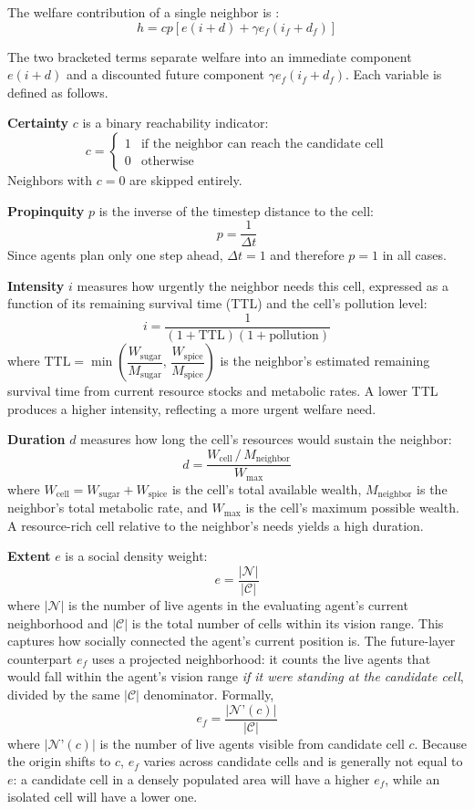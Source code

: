 \documentclass{icsthesis}
\begin{document}
\begin{mainmatter}
The welfare contribution of a single neighbor is \citep{KremerHerman2024b}:
\[ h = cp \left[ e(i+d) + \gamma e_f(i_f+d_f) \right] \]

The two bracketed terms separate welfare into an immediate component $e(i+d)$ and a discounted future component $\gamma e_f(i_f+d_f)$. Each variable is defined as follows.

\textbf{Certainty} $c$ is a binary reachability indicator:
\[
c = \begin{cases} 1 & \text{if the neighbor can reach the candidate cell} \\ 0 & \text{otherwise} \end{cases}
\]
Neighbors with $c = 0$ are skipped entirely.

\textbf{Propinquity} $p$ is the inverse of the timestep distance to the cell:
\[
p = \frac{1}{\Delta t}
\]
Since agents plan only one step ahead, $\Delta t = 1$ and therefore $p = 1$ in all cases.

\textbf{Intensity} $i$ measures how urgently the neighbor needs this cell, expressed as a function of its remaining survival time (TTL) and the cell’s pollution level:
\[
i = \frac{1}{(1 + \mathrm{TTL})(1 + \mathrm{pollution})}
\]
where $\mathrm{TTL} = \min\!\left(\dfrac{W_{\mathrm{sugar}}}{M_{\mathrm{sugar}}},\, \dfrac{W_{\mathrm{spice}}}{M_{\mathrm{spice}}}\right)$ is the neighbor’s estimated remaining survival time from current resource stocks and metabolic rates. A lower TTL produces a higher intensity, reflecting a more urgent welfare need.

\textbf{Duration} $d$ measures how long the cell’s resources would sustain the neighbor:
\[
d = \frac{W_{\mathrm{cell}}\,/\,M_{\mathrm{neighbor}}}{W_{\mathrm{max}}}
\]
where $W_{\mathrm{cell}} = W_{\mathrm{sugar}} + W_{\mathrm{spice}}$ is the cell’s total available wealth, $M_{\mathrm{neighbor}}$ is the neighbor’s total metabolic rate, and $W_{\mathrm{max}}$ is the cell’s maximum possible wealth. A resource-rich cell relative to the neighbor’s needs yields a high duration.

\textbf{Extent} $e$ is a social density weight:
\[
e = \frac{|\mathcal{N}|}{|\mathcal{C}|}
\]
where $|\mathcal{N}|$ is the number of live agents in the evaluating agent’s current neighborhood and $|\mathcal{C}|$ is the total number of cells within its vision range. This captures how socially connected the agent’s current position is. The future-layer counterpart $e_f$ uses a projected neighborhood: it counts the live agents that would fall within the agent’s vision range \emph{if it were standing at the candidate cell}, divided by the same $|\mathcal{C}|$ denominator. Formally,
\[
e_f = \frac{|\mathcal{N}’(c)|}{|\mathcal{C}|}
\]
where $|\mathcal{N}’(c)|$ is the number of live agents visible from candidate cell $c$. Because the origin shifts to $c$, $e_f$ varies across candidate cells and is generally not equal to $e$: a candidate cell in a densely populated area will have a higher $e_f$, while an isolated cell will have a lower one.


\end{mainmatter}
\end{document}
